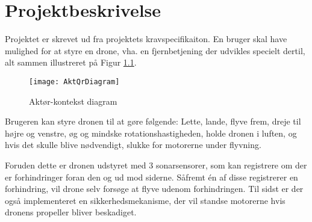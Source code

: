\documentclass[Main]{subfiles}
\begin{document}
		
	

\chapter{Projektbeskrivelse}

Projektet er skrevet ud fra projektets kravspecifikaiton\cite{Kravspec}.
En bruger skal have mulighed for at styre en drone, vha. en fjernbetjening der udvikles specielt dertil, alt sammen illustreret på Figur \ref{Fig:Aktor-oversigt}.

\begin{figure}[H]
\centering
\texttt{[image: AktQrDiagram]}
\caption{Aktør-kontekst diagram}
\label{Fig:Aktor-oversigt}
\end{figure}
\vspace{-20pt}

Brugeren kan styre dronen til at gøre følgende: Lette, lande, flyve frem, dreje til højre og venstre, øg og mindske rotationshastigheden, holde dronen i luften, og hvis det skulle blive nødvendigt, slukke for motorerne under flyvning.

Foruden dette er dronen udstyret med 3 sonarsensorer, som kan registrere om der er forhindringer foran den og ud mod siderne.
Såfremt én af disse registrerer en forhindring, vil drone selv forsøge at flyve udenom forhindringen.
Til sidst er der også implementeret en sikkerhedsmekanisme, der vil standse motorerne hvis dronens propeller bliver beskadiget.
\end{document}
